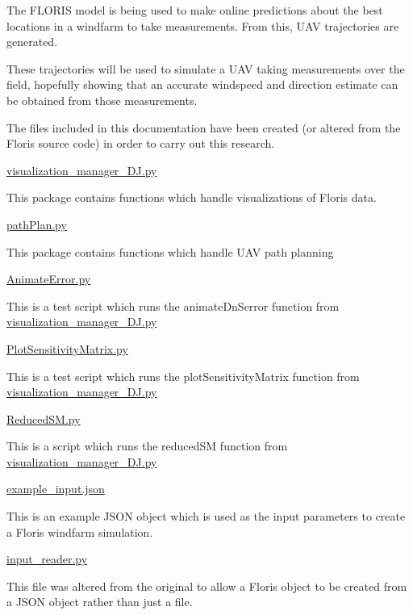 The F\+L\+O\+R\+IS model is being used to make online predictions about the best locations in a windfarm to take measurements. From this, U\+AV trajectories are generated.

These trajectories will be used to simulate a U\+AV taking measurements over the field, hopefully showing that an accurate windspeed and direction estimate can be obtained from those measurements.

The files included in this documentation have been created (or altered from the Floris source code) in order to carry out this research.

\mbox{\hyperlink{visualization__manager___d_j_8py}{visualization\+\_\+manager\+\_\+\+D\+J.\+py}}

This package contains functions which handle visualizations of Floris data.

\mbox{\hyperlink{path_plan_8py}{path\+Plan.\+py}}

This package contains functions which handle U\+AV path planning

\mbox{\hyperlink{_animate_error_8py}{Animate\+Error.\+py}}

This is a test script which runs the animate\+Dn\+Serror function from \mbox{\hyperlink{visualization__manager___d_j_8py}{visualization\+\_\+manager\+\_\+\+D\+J.\+py}}

\mbox{\hyperlink{_plot_sensitivity_matrix_8py}{Plot\+Sensitivity\+Matrix.\+py}}

This is a test script which runs the plot\+Sensitivity\+Matrix function from \mbox{\hyperlink{visualization__manager___d_j_8py}{visualization\+\_\+manager\+\_\+\+D\+J.\+py}}

\mbox{\hyperlink{_reduced_s_m_8py}{Reduced\+S\+M.\+py}}

This is a script which runs the reduced\+SM function from \mbox{\hyperlink{visualization__manager___d_j_8py}{visualization\+\_\+manager\+\_\+\+D\+J.\+py}}

\mbox{\hyperlink{example__input_8json}{example\+\_\+input.\+json}}

This is an example J\+S\+ON object which is used as the input parameters to create a Floris windfarm simulation.

\mbox{\hyperlink{input__reader_8py}{input\+\_\+reader.\+py}}

This file was altered from the original to allow a Floris object to be created from a J\+S\+ON object rather than just a file. 